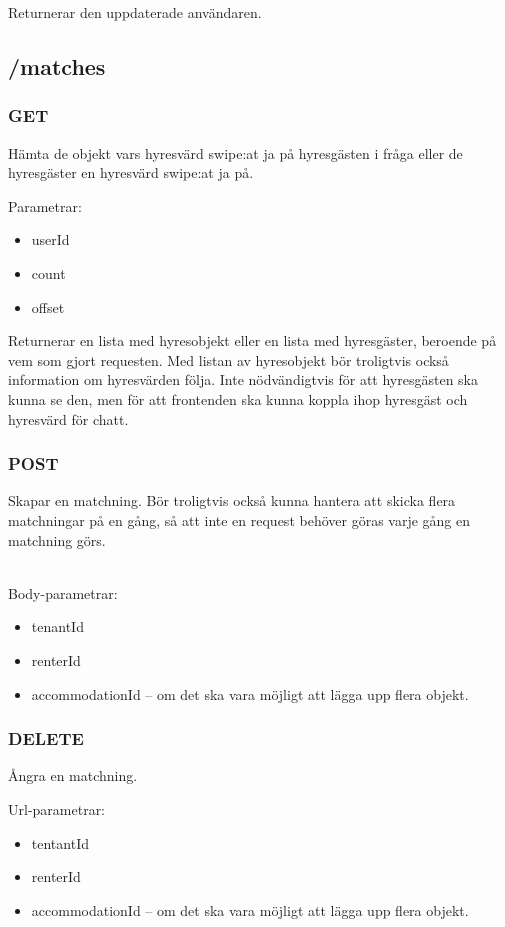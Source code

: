 \documentclass{article}
\begin{document}
Returnerar den uppdaterade användaren.

\subsection {/matches}
\label{sub:/matches}

\subsubsection {GET}
\label{ssub:GET}

Hämta de objekt vars hyresvärd swipe:at ja på hyresgästen i fråga eller de hyresgäster en hyresvärd swipe:at ja på.

Parametrar:

\begin{itemize}
    \item userId 
    \item count
    \item offset
\end{itemize}

Returnerar en lista med hyresobjekt eller en lista med hyresgäster, beroende på vem som gjort requesten. Med listan av hyresobjekt bör troligtvis också
information om hyresvärden följa. Inte nödvändigtvis för att hyresgästen ska kunna se den, men för att frontenden ska kunna koppla ihop hyresgäst och
hyresvärd för chatt.

\subsubsection {POST}
\label{ssub:POST}

Skapar en matchning. Bör troligtvis också kunna hantera att skicka flera matchningar på en gång, så att inte en request behöver göras varje gång en
matchning görs.

\\Body-parametrar:

\begin{itemize}
    \item tenantId
    \item renterId
    \item accommodationId -- om det ska vara möjligt att lägga upp flera objekt.
\end{itemize}

\subsubsection {DELETE}
\label{ssub:DELETE}

Ångra en matchning.

Url-parametrar:

\begin{itemize}
    \item tentantId
    \item renterId
    \item accommodationId -- om det ska vara möjligt att lägga upp flera objekt.
\end{itemize}
\end{document}
